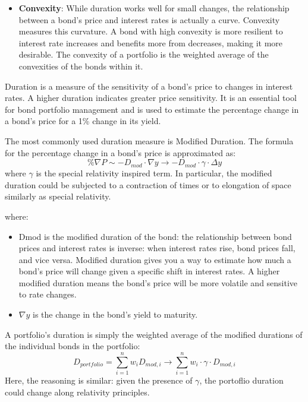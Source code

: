 \documentclass{article}
\begin{document}
\begin{itemize}
Analogously, a project's timeline or scope can appear to expand or contract depending on the infomration processing of its execution, much like time and space change from an observer's perspective in physics.
\item \textbf{Convexity}: While duration works well for small changes, the relationship between a bond's price and interest rates is actually a curve. Convexity measures this curvature. A bond with high convexity is more resilient to interest rate increases and benefits more from decreases, making it more desirable. The convexity of a portfolio is the weighted average of the convexities of the bonds within it.
\end{itemize}


Duration is a measure of the sensitivity of a bond's price to changes in interest rates. A higher duration indicates greater price sensitivity. It is an essential tool for bond portfolio management and is used to estimate the percentage change in a bond's price for a 1\% change in its yield.

The most commonly used duration measure is Modified Duration. The formula for the percentage change in a bond's price is approximated as:
\begin{equation}
    \% \nabla P \sim - D_{mod} \cdot \nabla y \rightarrow -D_{mod} \cdot \gamma \cdot \Delta y
\end{equation}
where $\gamma$ is the special relativity inspired term. In particular, the modified duration could be subjected to a contraction of times or to elongation of space similarly as special relativity. 


where:
\begin{itemize}
\item Dmod is the modified duration of the bond: the relationship between bond prices and interest rates is inverse: when interest rates rise, bond prices fall, and vice versa. Modified duration gives you a way to estimate how much a bond's price will change given a specific shift in interest rates. A higher modified duration means the bond's price will be more volatile and sensitive to rate changes. 
\item $\nabla y$ is the change in the bond's yield to maturity.
\end{itemize}

A portfolio's duration is simply the weighted average of the modified durations of the individual bonds in the portfolio:
\begin{equation}
    D_{portfolio} = \sum_{i=1}^n w_i D_{mod,i} \rightarrow \sum_{i=1}^n w_i \cdot \gamma \cdot D_{mod,i}
\end{equation}
Here, the reasoning is similar: given the presence of $\gamma$, the portoflio duration could change along relativity principles.
\end{document}
